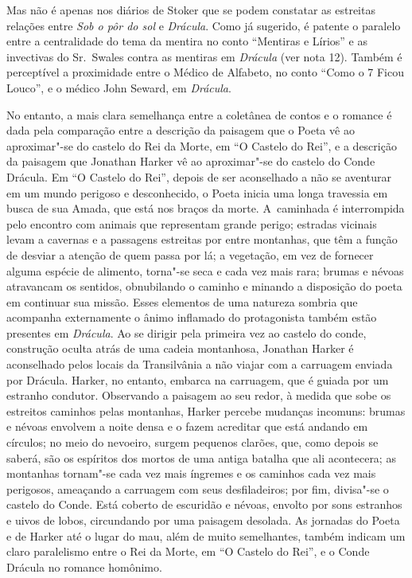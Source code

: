Mas não é apenas nos diários de Stoker que se podem constatar as
estreitas relações entre \emph{Sob o pôr do sol} e \emph{Drácula}. Como já sugerido, é
patente o paralelo entre a centralidade do tema da mentira no conto
``Mentiras e Lírios'' e as invectivas do Sr.~Swales contra as mentiras
em \emph{Drácula} (ver nota 12). Também é perceptível a proximidade entre o
Médico de Alfabeto, no conto ``Como o 7 Ficou Louco'', e o médico John
Seward, em \emph{Drácula}.

No entanto, a mais clara semelhança entre a coletânea de contos e o
romance é dada pela comparação entre a descrição da paisagem que o Poeta
vê ao aproximar"-se do castelo do Rei da Morte, em ``O Castelo do Rei'',
e a descrição da paisagem que Jonathan Harker vê ao aproximar"-se do
castelo do Conde Drácula. Em ``O Castelo do Rei'', depois de ser
aconselhado a não se aventurar em um mundo perigoso e desconhecido, o
Poeta inicia uma longa travessia em busca de sua Amada, que está nos
braços da morte. A~caminhada é interrompida pelo encontro com animais
que representam grande perigo; estradas vicinais levam a cavernas e a
passagens estreitas por entre montanhas, que têm a função de desviar a
atenção de quem passa por lá; a vegetação, em vez de fornecer alguma
espécie de alimento, torna"-se seca e cada vez mais rara; brumas e névoas
atravancam os sentidos, obnubilando o caminho e minando a disposição do
poeta em continuar sua missão. Esses elementos de uma natureza sombria
que acompanha externamente o ânimo inflamado do protagonista também
estão presentes em \emph{Drácula}. Ao se dirigir pela primeira vez ao
castelo do conde, construção oculta atrás de uma cadeia montanhosa,
Jonathan Harker é aconselhado pelos locais da Transilvânia a não viajar
com a carruagem enviada por Drácula. Harker, no entanto, embarca na
carruagem, que é guiada por um estranho condutor. Observando a paisagem
ao seu redor, à medida que sobe os estreitos caminhos pelas montanhas,
Harker percebe mudanças incomuns: brumas e névoas envolvem a noite densa
e o fazem acreditar que está andando em círculos; no meio do nevoeiro,
surgem pequenos clarões, que, como depois se saberá, são os espíritos
dos mortos de uma antiga batalha que ali acontecera; as montanhas
tornam"-se cada vez mais íngremes e os caminhos cada vez mais perigosos,
ameaçando a carruagem com seus desfiladeiros; por fim, divisa"-se o
castelo do Conde. Está coberto de escuridão e névoas, envolto por sons
estranhos e uivos de lobos, circundando por uma paisagem desolada. As
jornadas do Poeta e de Harker até o lugar do mau, além de muito
semelhantes, também indicam um claro paralelismo entre o Rei da Morte,
em ``O Castelo do Rei'', e o Conde Drácula no romance homônimo.

